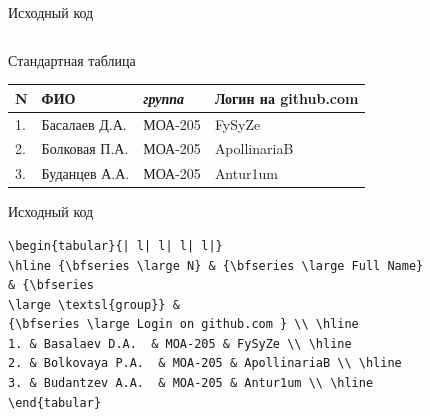 \documentclass{beamer}[aspectratio=169]
\begin{document}
\begin{frame}[fragile]{Исходный код}
\begin{adjustbox}{scale=0.6}
\begin{large}
\begin{lstlisting}[language=Tex]
\end{lstlisting}
\end{large}
\end{adjustbox}
\end{frame}


\begin{frame}{Стандартная таблица}
\begin{tabular}{| l| l| l| l|}
\hline {\bfseries \large N} & {\bfseries \large ФИО} & {\bfseries \large \textsl{группа}} & {\bfseries \large Логин на github.com } \\ \hline
1. & Басалаев Д.А.  & МОА-205 & FySyZe \\ \hline
2. & Болковая П.А.  & МОА-205 & ApollinariaB \\ \hline
3. & Буданцев А.А.  & МОА-205 & Antur1um \\ \hline
\end{tabular}
\end{frame}

\begin{frame}[fragile,label=frame_A]{Исходный код}
\begin{adjustbox}{scale=0.6}
\begin{large}
\transwipe

 \begin{lstlisting}[language=Tex]
  \begin{tabular}{| l| l| l| l|}
\hline {\bfseries \large N} & {\bfseries \large Full Name}
& {\bfseries 
\large \textsl{group}} & 
{\bfseries \large Login on github.com } \\ \hline
1. & Basalaev D.A.  & MOA-205 & FySyZe \\ \hline
2. & Bolkovaya P.A.  & MOA-205 & ApollinariaB \\ \hline
3. & Budantzev A.A.  & MOA-205 & Antur1um \\ \hline
\end{tabular}

\end{lstlisting}
\end{large}
\end{adjustbox}
\end{frame}
\end{document}
